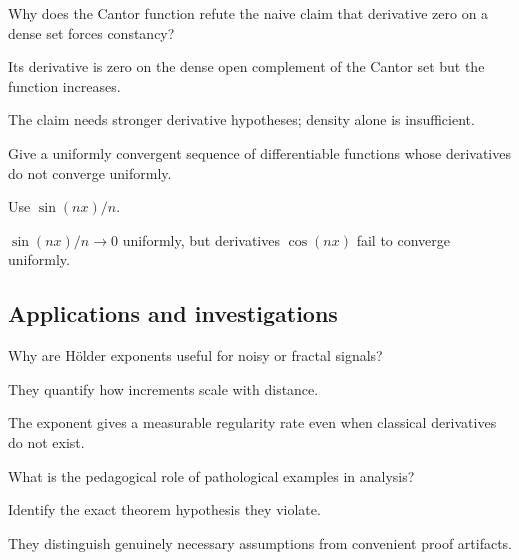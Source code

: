 \begin{exercise}\label{exr:ii15-expand-11}
Why does the Cantor function refute the naive claim that derivative zero on a dense set forces constancy?
\end{exercise}
\begin{hint}
Its derivative is zero on the dense open complement of the Cantor set but the function increases.
\end{hint}
\begin{solution}
The claim needs stronger derivative hypotheses; density alone is insufficient.
\end{solution}

\begin{exercise}\label{exr:ii15-expand-12}
Give a uniformly convergent sequence of differentiable functions whose derivatives do not converge uniformly.
\end{exercise}
\begin{hint}
Use \(\sin(nx)/n\).
\end{hint}
\begin{solution}
\(\sin(nx)/n\to0\) uniformly, but derivatives \(\cos(nx)\) fail to converge uniformly.
\end{solution}

\subsection*{Applications and investigations}

\begin{exercise}\label{exr:ii15-expand-13}
Why are Hölder exponents useful for noisy or fractal signals?
\end{exercise}
\begin{hint}
They quantify how increments scale with distance.
\end{hint}
\begin{solution}
The exponent gives a measurable regularity rate even when classical derivatives do not exist.
\end{solution}

\begin{exercise}\label{exr:ii15-expand-14}
What is the pedagogical role of pathological examples in analysis?
\end{exercise}
\begin{hint}
Identify the exact theorem hypothesis they violate.
\end{hint}
\begin{solution}
They distinguish genuinely necessary assumptions from convenient proof artifacts.
\end{solution}

